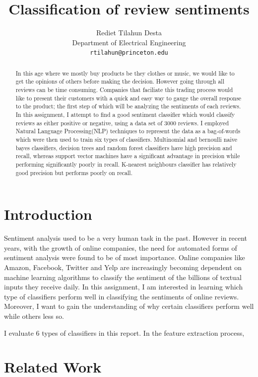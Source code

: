 \documentclass{article} %
\title{Classification of review sentiments}
\author{
Rediet Tilahun Desta\\
Department of Electrical Engineering\\
\texttt{rtilahun@princeton.edu} \\
}
\begin{document}
\maketitle

\begin{abstract}
In this age where we mostly buy products be they clothes or music, we would like to get the opinions of others before making the decision. However going through all reviews can be time consuming. Companies that faciliate this trading process would like to present their customers with a quick and easy way to gauge the overall response to the product; the first step of which will be analyzing the sentiments of each reviews. In this assignment, I attempt to find a good sentiment classifier which would classify reviews as either positive or negative, using a data set of 3000 reviews. I employed Natural Language Processing(NLP) techniques to represent the data as a bag-of-words which were then used to train six types of classifiers.  Multinomial and bernoulli naive bayes classifiers, decision trees and random forest classifiers have high precision and recall, whereas support vector machines have a significant advantage in precision while performing significantly poorly in recall. K-nearest neighbours classifier has relatively good precision but performs poorly on recall.
\end{abstract}

\section{Introduction}
Sentiment analysis used to be a very human task in the past. However in recent years, with the growth of online companies, the need for automated forms of sentiment analysis were found to be of most importance. Online companies like Amazon, Facebook, Twitter and Yelp are increasingly becoming dependent on machine learning algorithms to classify the sentiment of the billions of textual inputs they receive daily. In this assignment, I am interested in learning which type of classifiers perform well in classifying the sentiments of online reviews. Moreover, I want to gain the understanding of why certain classifiers perform well while others less so. 

I evaluate 6 types of classifiers in this report. In the feature extraction process, 


\section{Related Work}
\end{document}
